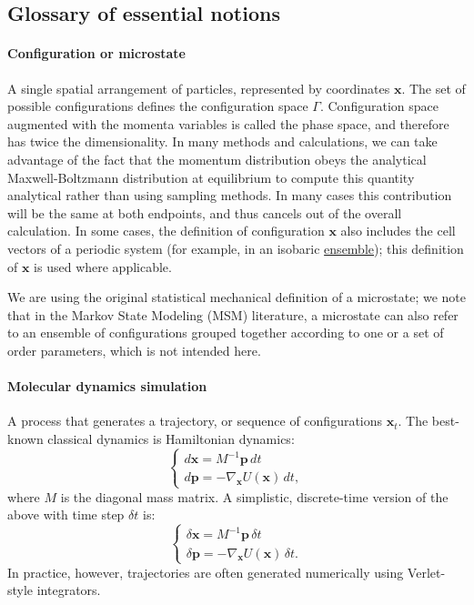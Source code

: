 \documentclass[9pt,review]{livecoms}
\newcommand{\vx}{\mathbf{x}}
\newcommand{\vp}{\mathbf{p}}
\begin{document}
\subsection{Glossary of essential notions}
\label{sec:glossary}

\hypertarget{ref:Microstate} {\paragraph{Configuration or microstate}}
A single spatial arrangement of particles, represented by coordinates $\vx$. The set of possible configurations defines the configuration space $\Gamma$.
Configuration space augmented with the momenta variables is called the phase space, and therefore has twice the dimensionality. In many methods and calculations, we can take advantage of the fact that the momentum distribution obeys the analytical Maxwell-Boltzmann distribution at equilibrium to compute this quantity analytical rather than using sampling methods.  In many cases this contribution will be the same at both endpoints, and thus cancels out of the overall calculation.
In some cases, the  definition of configuration $\vx$ also includes the cell vectors of a periodic system (for example, in an isobaric \hyperlink{ref:Ensemble} {ensemble}); this definition of $\vx$ is used where applicable.

We are using the original statistical mechanical definition of a microstate; we note that in the Markov State Modeling (MSM) literature, a microstate can also refer to an ensemble of configurations grouped together according to one or a set of order parameters, which is not intended here.

\hypertarget{ref:MolecularDynamics}{\paragraph{Molecular dynamics simulation}}
A process that generates a trajectory, or sequence of configurations $\vx_t$.
The best-known classical dynamics is Hamiltonian dynamics:
\begin{equation}
\left\{
\begin{array}{ll}
    d\vx = M^{-1} \vp \,  dt \\
    d\vp = -\nabla_\vx U(\vx) \, dt,
\end{array}
\right.
    \label{eq:md}
\end{equation}
where $M$ is the diagonal mass matrix.
A simplistic, discrete-time version of the above with time step $\delta t$ is:
\begin{equation}
\left\{
\begin{array}{ll}
    \delta \vx = M^{-1} \vp \, \delta t \\
    \delta \vp = -\nabla_\vx U(\vx) \, \delta t.
    \label{eq:md_discrete}
\end{array}
\right.
\end{equation}
In practice, however, trajectories are often generated numerically using Verlet-style integrators.
\end{document}
